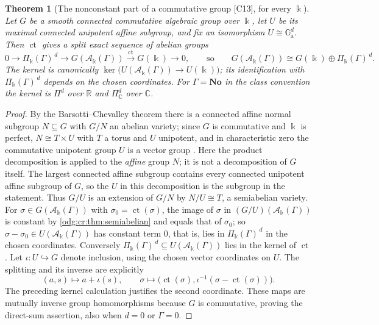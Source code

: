 \documentclass[11pt,oneside]{article}
\numberwithin{equation}{section}
\newtheorem{theorem}{Theorem}[section]
\theoremstyle{definition}
\theoremstyle{remark}
\newcommand{\No}{\mathbf{No}}
\newcommand{\R}{\mathbb R}
\newcommand{\C}{\mathbb C}
\newcommand{\ct}{\operatorname{ct}}
\newcommand{\src}[1]{\textup{\textsf{\small[#1]}}}
\newcommand{\crA}{\mathcal A_\Bbbk(\Gamma)}
\newcommand{\crP}{\Pi_\Bbbk(\Gamma)}
\newcommand{\Ga}{\mathbb G_{\mathrm a}}
\begin{document}
\begin{theorem}[The nonconstant part of a commutative group \src{C13}, for every $\Bbbk$]\label{odg:cr:thm:groupkernel}
Let $G$ be a smooth connected commutative algebraic group over $\Bbbk$, let $U$ be its
maximal connected unipotent affine subgroup, and fix an isomorphism
$U\cong\Ga^d$. Then $\ct$ gives a split exact sequence of abelian groups
\[
 0\longrightarrow\crP^{\,d}\longrightarrow G(\crA)
 \xrightarrow{\ \ct\ }G(\Bbbk)\longrightarrow0,
 \qquad\text{so}\qquad G(\crA)\cong G(\Bbbk)\oplus\crP^{\,d}.
\]
The kernel is canonically $\ker\bigl(U(\crA)\to U(\Bbbk)\bigr)$; its identification with
$\crP^{\,d}$ depends on the chosen coordinates. For $\Gamma=\No$ in the class
convention the kernel is $\Pi^d$ over $\R$ and $\Pi_\C^d$ over $\C$.
\end{theorem}
\begin{proof}
By the Barsotti--Chevalley theorem there is a connected affine normal subgroup
$N\subseteq G$ with $G/N$ an abelian variety; since $G$ is commutative and $\Bbbk$ is
perfect, $N\cong T\times U$ with $T$ a torus and $U$ unipotent, and in
characteristic zero the commutative unipotent group $U$ is a vector group
\cite[Theorem 8.27, Corollaries 14.33, 16.15]{MilneAG}.
Here the product decomposition is applied to the \emph{affine} group $N$;
it is not a decomposition of $G$ itself. The largest connected affine
subgroup contains every connected unipotent affine subgroup of $G$, so
the $U$ in this decomposition is the subgroup in the statement.
Thus $G/U$ is an extension of
$G/N$ by $N/U\cong T$, a semiabelian variety. For $\sigma\in G(\crA)$ with
$\sigma_0=\ct(\sigma)$, the image of $\sigma$ in $(G/U)(\crA)$ is constant by
\cref{odg:cr:thm:semiabelian} and equals that of $\sigma_0$; so
$\sigma-\sigma_0\in U(\crA)$ has constant term $0$, that is, lies in $\crP^{\,d}$ in the
chosen coordinates. Conversely $\crP^{\,d}\subseteq U(\crA)$ lies in the kernel of $\ct$.
Let $\iota:U\hookrightarrow G$ denote inclusion, using the chosen vector
coordinates on $U$. The splitting and its inverse are explicitly
\[
 (a,s)\longmapsto a+\iota(s),\qquad
 \sigma\longmapsto\bigl(\ct(\sigma),
     \iota^{-1}(\sigma-\ct(\sigma))\bigr).
\]
The preceding kernel calculation justifies the second coordinate.
These maps are mutually inverse group homomorphisms because $G$ is
commutative, proving the direct-sum assertion, also when $d=0$ or $\Gamma=0$.
\end{proof}
\end{document}
